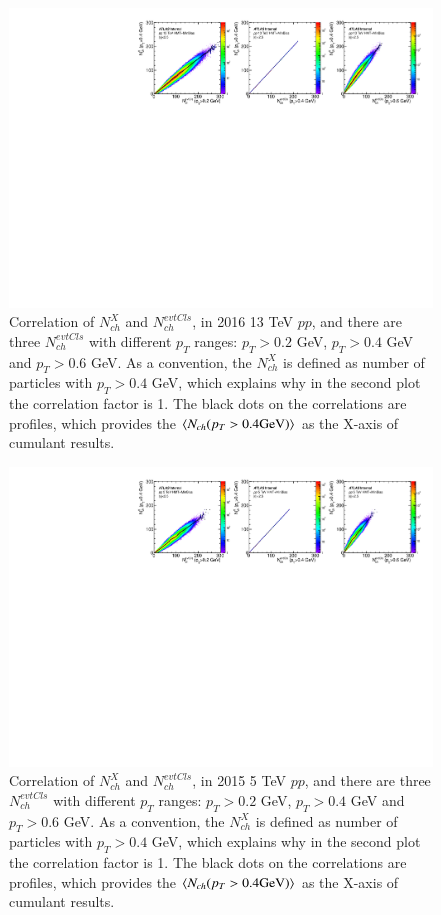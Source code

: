\begin{figure}[H]
\centering
\includegraphics[width=1.\linewidth]{figs/sec_ana/mon_pp13_2016_trkXaxis.pdf}
\caption{Correlation of $N_{ch}^{X}$ and $N_{ch}^{evtCls}$, in 2016 13 TeV $pp$, and there are three $N_{ch}^{evtCls}$ with different $p_{T}$ ranges: $p_{T}>0.2$ GeV, $p_{T}>0.4$ GeV and $p_{T}>0.6$ GeV. As a convention, the $N_{ch}^{X}$ is defined as number of particles with $p_{T}>0.4$ GeV, which explains why in the second plot the correlation factor is 1. The black dots on the correlations are profiles, which provides the $\left\langle N_{ch} (p_{T}>0.4 \text{GeV})\right\rangle$ as the X-axis of cumulant results.}
\label{fig:mon_pp13_2016_trkXaxis}
\end{figure}
\begin{figure}[H]
\centering
\includegraphics[width=1.\linewidth]{figs/sec_ana/mon_pp5_2015_trkXaxis.pdf}
\caption{Correlation of $N_{ch}^{X}$ and $N_{ch}^{evtCls}$, in 2015 5 TeV $pp$, and there are three $N_{ch}^{evtCls}$ with different $p_{T}$ ranges: $p_{T}>0.2$ GeV, $p_{T}>0.4$ GeV and $p_{T}>0.6$ GeV. As a convention, the $N_{ch}^{X}$ is defined as number of particles with $p_{T}>0.4$ GeV, which explains why in the second plot the correlation factor is 1. The black dots on the correlations are profiles, which provides the $\left\langle N_{ch} (p_{T}>0.4 \text{GeV})\right\rangle$ as the X-axis of cumulant results.}
\label{fig:mon_pp5_2015_trkXaxis}
\end{figure}


